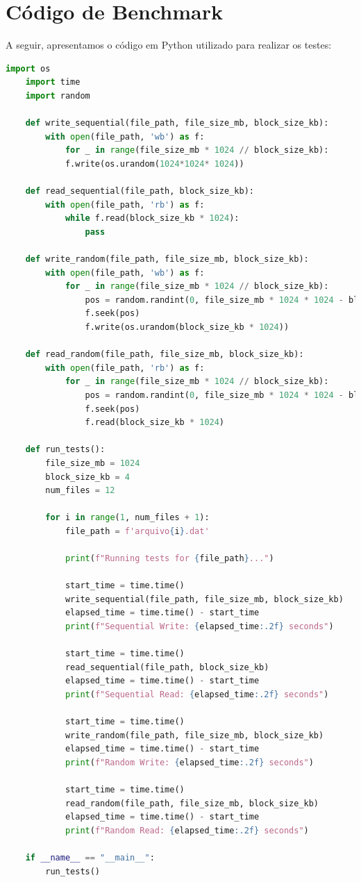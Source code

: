 \documentclass[
	12pt,				%
	openright,			%
	oneside,			%
	a4paper,			%
	chapter=TITLE,		%
	english,			%
	french,				%
	spanish,			%
	brazil				%
	]{abntex2}
\theoremstyle{definition}
\begin{document}
\section{Código de Benchmark}

A seguir, apresentamos o código em Python utilizado para realizar os testes:

\begin{lstlisting}[language=Python, caption={Código de Benchmark}, label=benchmark_code]
	import os
	import time
	import random
	
	def write_sequential(file_path, file_size_mb, block_size_kb):
		with open(file_path, 'wb') as f:
			for _ in range(file_size_mb * 1024 // block_size_kb):
			f.write(os.urandom(1024*1024* 1024)) 
	
	def read_sequential(file_path, block_size_kb):
		with open(file_path, 'rb') as f:
			while f.read(block_size_kb * 1024):
				pass
	
	def write_random(file_path, file_size_mb, block_size_kb):
		with open(file_path, 'wb') as f:
			for _ in range(file_size_mb * 1024 // block_size_kb):
				pos = random.randint(0, file_size_mb * 1024 * 1024 - block_size_kb * 1024)
				f.seek(pos)
				f.write(os.urandom(block_size_kb * 1024))
	
	def read_random(file_path, file_size_mb, block_size_kb):
		with open(file_path, 'rb') as f:
			for _ in range(file_size_mb * 1024 // block_size_kb):
				pos = random.randint(0, file_size_mb * 1024 * 1024 - block_size_kb * 1024)
				f.seek(pos)
				f.read(block_size_kb * 1024)
	
	def run_tests():
		file_size_mb = 1024
		block_size_kb = 4
		num_files = 12
	
		for i in range(1, num_files + 1):
			file_path = f'arquivo{i}.dat'
	
			print(f"Running tests for {file_path}...")
			
			start_time = time.time()
			write_sequential(file_path, file_size_mb, block_size_kb)
			elapsed_time = time.time() - start_time
			print(f"Sequential Write: {elapsed_time:.2f} seconds")
	
			start_time = time.time()
			read_sequential(file_path, block_size_kb)
			elapsed_time = time.time() - start_time
			print(f"Sequential Read: {elapsed_time:.2f} seconds")
	
			start_time = time.time()
			write_random(file_path, file_size_mb, block_size_kb)
			elapsed_time = time.time() - start_time
			print(f"Random Write: {elapsed_time:.2f} seconds")
	
			start_time = time.time()
			read_random(file_path, file_size_mb, block_size_kb)
			elapsed_time = time.time() - start_time
			print(f"Random Read: {elapsed_time:.2f} seconds")
	
	if __name__ == "__main__":
		run_tests()
\end{lstlisting}
\end{document}
